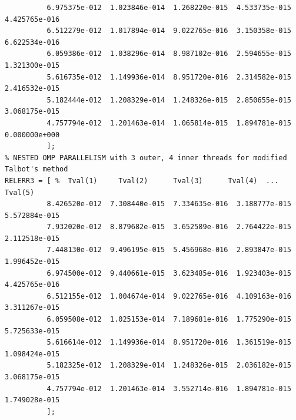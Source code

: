 \documentclass[a4paper,10pt]{report}%
\begin{document}
\begin{lstlisting}
          6.975375e-012  1.023846e-014  1.268220e-015  4.533735e-015  4.425765e-016
          6.512279e-012  1.017894e-014  9.022765e-016  3.150358e-015  6.622534e-016
          6.059386e-012  1.038296e-014  8.987102e-016  2.594655e-015  1.321300e-015
          5.616735e-012  1.149936e-014  8.951720e-016  2.314582e-015  2.416532e-015
          5.182444e-012  1.208329e-014  1.248326e-015  2.850655e-015  3.068175e-015
          4.757794e-012  1.201463e-014  1.065814e-015  1.894781e-015  0.000000e+000
          ];
% NESTED OMP PARALLELISM with 3 outer, 4 inner threads for modified Talbot's method
RELERR3 = [ %  Tval(1)     Tval(2)      Tval(3)      Tval(4)  ... Tval(5)
          8.426520e-012  7.308440e-015  7.334635e-016  3.188777e-015  5.572884e-015
          7.932020e-012  8.879682e-015  3.652589e-016  2.764422e-015  2.112518e-015
          7.448130e-012  9.496195e-015  5.456968e-016  2.893847e-015  1.996452e-015
          6.974500e-012  9.440661e-015  3.623485e-016  1.923403e-015  4.425765e-016
          6.512155e-012  1.004674e-014  9.022765e-016  4.109163e-016  3.311267e-015
          6.059508e-012  1.025153e-014  7.189681e-016  1.775290e-015  5.725633e-015
          5.616614e-012  1.149936e-014  8.951720e-016  1.361519e-015  1.098424e-015
          5.182325e-012  1.208329e-014  1.248326e-015  2.036182e-015  3.068175e-015
          4.757794e-012  1.201463e-014  3.552714e-016  1.894781e-015  1.749028e-015
          ];
\end{lstlisting}
\end{document}
